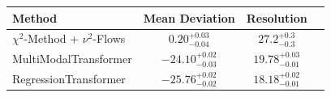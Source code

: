     \begin{tabular}{lccc}
        \toprule
        Method & Mean Deviation & Resolution \\
        \midrule
        $\chi^2$-Method + $\nu^2$-Flows & $0.20_{-0.04}^{+0.03}$ & $27.2_{-0.3}^{+0.3}$ \\
        MultiModalTransformer & $-24.10_{-0.03}^{+0.02}$ & $19.78_{-0.01}^{+0.03}$ \\
        RegressionTransformer & $-25.76_{-0.02}^{+0.02}$ & $18.18_{-0.01}^{+0.02}$ \\
        \bottomrule
    \end{tabular}